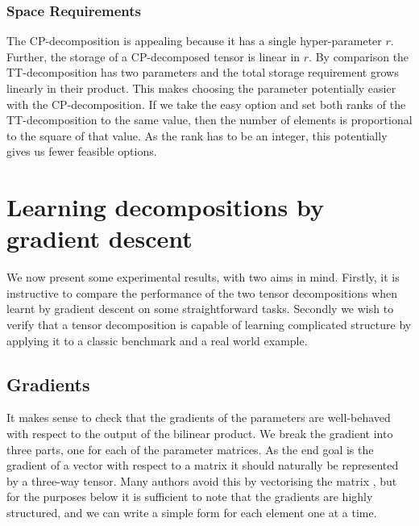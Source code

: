 
\subsubsection{Space Requirements}
The CP-decomposition is appealing because it has a single hyper-parameter \(r\). Further, the
storage of a CP-decomposed tensor is linear in \(r\). By comparison the TT-decomposition has
two parameters and the total storage requirement grows linearly in their product. This makes
choosing the parameter potentially easier with the CP-decomposition. If we take the easy option
and set both ranks of the TT-decomposition to the same value, then the number of elements is
proportional to the square of that value. As the rank has to be an integer, this potentially gives
us fewer feasible options.

\section{Learning decompositions by gradient descent}
We now present some experimental results, with two aims in mind. Firstly, it is instructive to compare
the performance of the two tensor decompositions when learnt by gradient descent on some
straightforward tasks. Secondly we wish to verify that a tensor decomposition is capable of learning
complicated structure by applying it to a classic benchmark and a real world example.

\subsection{Gradients}
It makes sense to check that the gradients of the parameters are well-behaved
with respect to the output of the bilinear product. We break the gradient into three parts,
one for each of the parameter matrices. As the end goal is the gradient of a vector with respect
to a matrix it should naturally be represented by a three-way tensor. Many authors avoid this by
vectorising the matrix \autocite{Magnus2007}, but for the purposes below it is sufficient to note
that the gradients are highly structured, and we can write a simple form for each element one at a
time.

